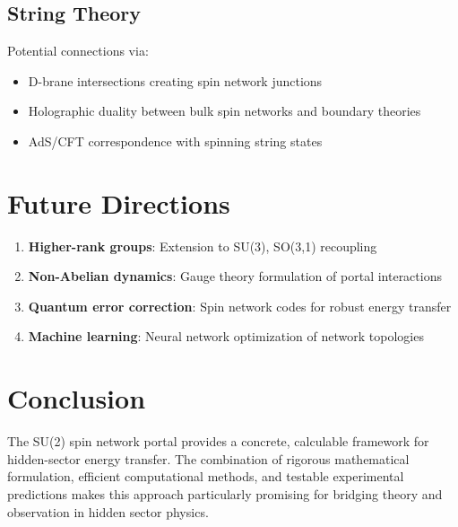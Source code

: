 \documentclass{article}
\begin{document}
\subsection{String Theory}

Potential connections via:
\begin{itemize}
\item D-brane intersections creating spin network junctions
\item Holographic duality between bulk spin networks and boundary theories
\item AdS/CFT correspondence with spinning string states
\end{itemize}

\section{Future Directions}

\begin{enumerate}
\item \textbf{Higher-rank groups}: Extension to SU(3), SO(3,1) recoupling
\item \textbf{Non-Abelian dynamics}: Gauge theory formulation of portal interactions
\item \textbf{Quantum error correction}: Spin network codes for robust energy transfer
\item \textbf{Machine learning}: Neural network optimization of network topologies
\end{enumerate}

\section{Conclusion}

The SU(2) spin network portal provides a concrete, calculable framework for hidden-sector energy transfer. The combination of rigorous mathematical formulation, efficient computational methods, and testable experimental predictions makes this approach particularly promising for bridging theory and observation in hidden sector physics.
\end{document}

